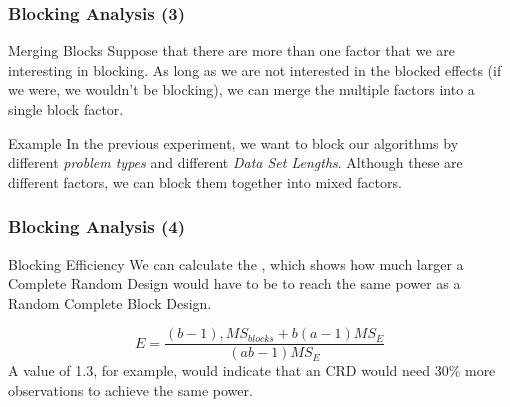 \documentclass[10pt]{beamer}
\begin{document}
\begin{frame}
  \frametitle{Blocking Analysis (3)}
  \begin{block}{Merging Blocks}
    Suppose that there are more than one factor that we are
    interesting in blocking. As long as we are not interested in the
    blocked effects (if we were, we wouldn't be blocking), we can
    merge the multiple factors into a single block factor.
  \end{block}
  \begin{block}{Example}
    In the previous experiment, we want to block our algorithms by
    different \emph{problem types} and different \emph{Data Set
      Lengths}. Although these are different factors, we can block
    them together into mixed factors.
  \end{block}
\end{frame}

\begin{frame}
  \frametitle{Blocking Analysis (4)}
  \begin{block}{Blocking Efficiency}
    We can calculate the , which shows
    how much larger a Complete Random Design would have to be to reach
    the same power as a Random Complete Block Design.
  \end{block}
  \begin{equation*}
    E = \frac{(b-1),MS_{blocks}+b(a-1)MS_E}{(ab-1)MS_E}
  \end{equation*}
  A value of 1.3, for example, would indicate that an CRD would need
  30\% more observations to achieve the same power.
\end{frame}
\end{document}
